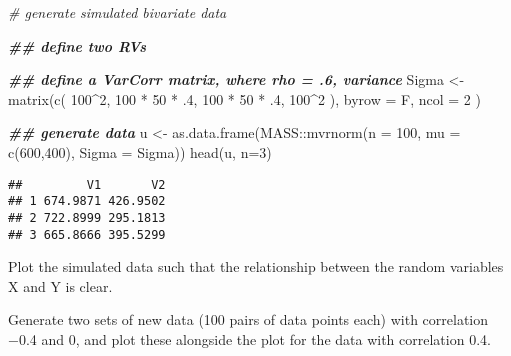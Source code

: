 \documentclass[
]{article}
\newenvironment{Shaded}{\begin{snugshade}}{\end{snugshade}}
\newcommand{\AttributeTok}[1]{\textcolor[rgb]{0.77,0.63,0.00}{#1}}
\newcommand{\CommentTok}[1]{\textcolor[rgb]{0.56,0.35,0.01}{\textit{#1}}}
\newcommand{\DecValTok}[1]{\textcolor[rgb]{0.00,0.00,0.81}{#1}}
\newcommand{\DocumentationTok}[1]{\textcolor[rgb]{0.56,0.35,0.01}{\textbf{\textit{#1}}}}
\newcommand{\FunctionTok}[1]{\textcolor[rgb]{0.00,0.00,0.00}{#1}}
\newcommand{\NormalTok}[1]{#1}
\newcommand{\OtherTok}[1]{\textcolor[rgb]{0.56,0.35,0.01}{#1}}
\newcommand{\SpecialCharTok}[1]{\textcolor[rgb]{0.00,0.00,0.00}{#1}}
\begin{document}
\begin{Shaded}
\begin{Highlighting}[]
\CommentTok{\# generate simulated bivariate data}

\DocumentationTok{\#\# define two RVs}

\DocumentationTok{\#\# define a VarCorr matrix, where rho = .6, variance}
\NormalTok{Sigma }\OtherTok{\textless{}{-}} \FunctionTok{matrix}\NormalTok{(}\FunctionTok{c}\NormalTok{(}
  \DecValTok{100}\SpecialCharTok{\^{}}\DecValTok{2}\NormalTok{, }\DecValTok{100} \SpecialCharTok{*} \DecValTok{50} \SpecialCharTok{*}\NormalTok{ .}\DecValTok{4}\NormalTok{, }
  \DecValTok{100} \SpecialCharTok{*} \DecValTok{50} \SpecialCharTok{*}\NormalTok{ .}\DecValTok{4}\NormalTok{, }\DecValTok{100}\SpecialCharTok{\^{}}\DecValTok{2} 
\NormalTok{  ),}
  \AttributeTok{byrow =}\NormalTok{ F, }\AttributeTok{ncol =} \DecValTok{2}
\NormalTok{  )}

\DocumentationTok{\#\# generate data}
\NormalTok{u }\OtherTok{\textless{}{-}} \FunctionTok{as.data.frame}\NormalTok{(MASS}\SpecialCharTok{::}\FunctionTok{mvrnorm}\NormalTok{(}\AttributeTok{n =} \DecValTok{100}\NormalTok{, }\AttributeTok{mu =} \FunctionTok{c}\NormalTok{(}\DecValTok{600}\NormalTok{,}\DecValTok{400}\NormalTok{), }\AttributeTok{Sigma =}\NormalTok{ Sigma))}
\FunctionTok{head}\NormalTok{(u, }\AttributeTok{n=}\DecValTok{3}\NormalTok{)}
\end{Highlighting}
\end{Shaded}

\begin{verbatim}
##         V1       V2
## 1 674.9871 426.9502
## 2 722.8999 295.1813
## 3 665.8666 395.5299
\end{verbatim}

Plot the simulated data such that the relationship between the random
variables X and Y is clear.

Generate two sets of new data (100 pairs of data points each) with
correlation −0.4 and 0, and plot these alongside the plot for the data
with correlation 0.4.
\end{document}
